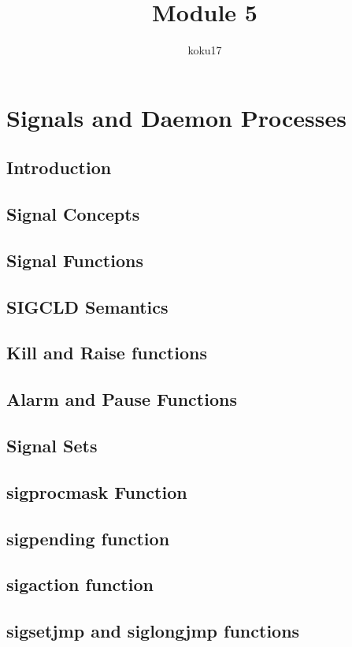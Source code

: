 \documentclass{article}
\author{koku17}
\title{Module 5}
\begin{document}
     \maketitle \newpage
     \tableofcontents \newpage

	\section{Signals and Daemon Processes}
	\subsection{Introduction}
	\subsection{Signal Concepts}
	\subsection{Signal Functions}
	\subsection{SIGCLD Semantics}
	\subsection{Kill and Raise functions}
	\subsection{Alarm and Pause Functions}
	\subsection{Signal Sets}
	\subsection{sigprocmask Function}
	\subsection{sigpending function}
	\subsection{sigaction function}
	\subsection{sigsetjmp and siglongjmp functions}
\end{document}
